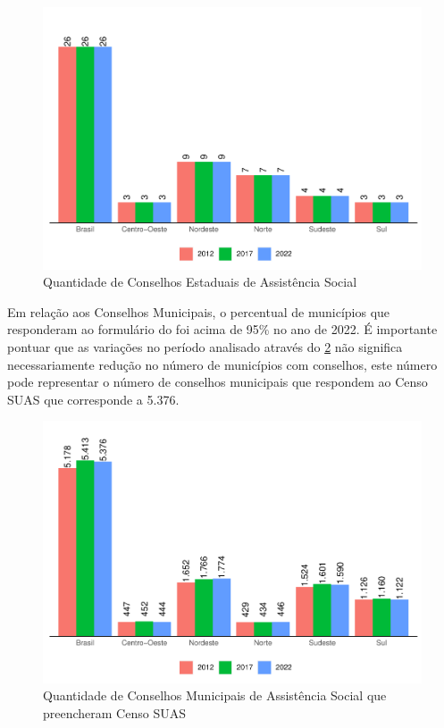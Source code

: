 \documentclass[
  brazilian]{report}
\begin{document}
\begin{figure}
\includegraphics{Censo-SUAS-2022_files/figure-latex/qtd-ceas-1} \caption[Quantidade de Conselhos Estaduais de Assistência Social]{Quantidade de Conselhos Estaduais de Assistência Social}\label{fig:qtd-ceas}
\end{figure}

Em relação aos Conselhos Municipais, o percentual de municípios que
responderam ao formulário do foi acima de 95\% no ano de 2022. É
importante pontuar que as variações no período analisado através do
\cref{fig:qtd-cmas} não significa necessariamente redução no número de
municípios com conselhos, este número pode representar o número de
conselhos municipais que respondem ao Censo SUAS que corresponde a
5.376.

\begin{figure}
\includegraphics{Censo-SUAS-2022_files/figure-latex/qtd-cmas-1} \caption[Quantidade de Conselhos Municipais de Assistência Social que preencheram Censo SUAS]{Quantidade de Conselhos Municipais de Assistência Social que preencheram Censo SUAS}\label{fig:qtd-cmas}
\end{figure}
\end{document}
